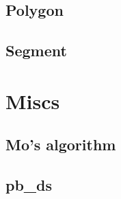\subsection{Polygon}
\raggedbottom
\subsection{Segment}
\raggedbottom



\section{Miscs}
\subsection{Mo's algorithm}

\subsection{pb\_ds}


\pagebreak

